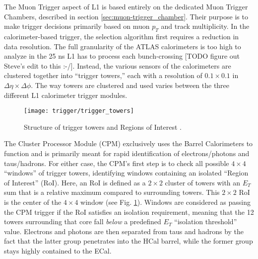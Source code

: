         The Muon Trigger aspect of L1 is based entirely on the dedicated Muon Trigger Chambers, described in section \ref{sec:muon-trigger_chamber}.
        Their purpose is to make trigger decisions primarily based on muon $p_T$ and track multiplicity\cite{trigger_run1}.
        In the calorimeter-based trigger, the selection algorithm first requires a reduction in data resolution.
        The full granularity of the ATLAS calorimeters is too high to analyze in the 25 ns L1 has to process each bunch-crossing
            [TODO figure out Steve's edit to this :-/].
        Instead, the various sensors of the calorimeters are clustered together into ``trigger towers,''
            each with a resolution of $0.1 \times 0.1$ in $\Delta \eta \times \Delta \phi$.
        The way towers are clustered and used varies between the three different L1 calorimeter trigger modules.

        \begin{figure}[h]
            \texttt{[image: trigger/trigger\_towers]}
            \caption{Structure of trigger towers and Regions of Interest \cite{L1_calo_run1}.}
            \label{fig:trigger_towers}
        \end{figure}


        The Cluster Processor Module (CPM) exclusively uses the Barrel Calorimeters to function
            and is primarily meant for rapid identification of electrons/photons and taus/hadrons.
        For either case, the CPM's first step is to check all possible $4 \times 4$ ``windows'' of trigger towers, identifying windows containing an isolated ``Region of Interest'' (RoI).
        Here, an RoI is defined as a $2 \times 2$ cluster of towers with an $E_T$ sum that is a relative maximum compared to surrounding towers.
        This $2 \times 2$ RoI is the center of the $4 \times 4$ window (see Fig. \ref{fig:trigger_towers}).
        Windows are considered as passing the CPM trigger if the RoI satisfies an isolation requirement, meaning that the 12 towers surrounding that core fall \textit{below} a predefined $E_T$ ``isolation threshold'' value.
        Electrons and photons are then separated from taus and hadrons by the fact that the latter group penetrates into the HCal barrel, while the former group stays highly contained to the ECal.

